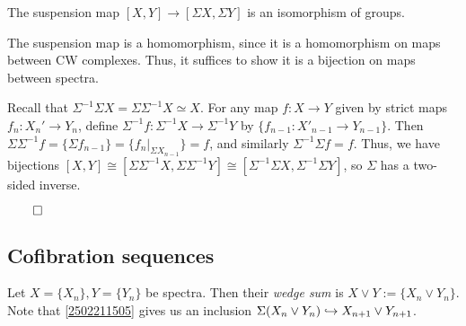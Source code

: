 \documentclass{MetricNotes2023}
\def\inj{\ensuremath\hookrightarrow}
\def\done{\begin{flushright}\vspace{-4.35ex}\(\qed\)\end{flushright}}
\begin{document}
\begin{theorem}\label{2504151310}
The suspension map \([X,Y]\to [\Sigma X, \Sigma Y]\) is an isomorphism of groups.
\end{theorem}

\begin{ourproof}
The suspension map is a homomorphism, since it is a homomorphism on maps between CW complexes. Thus, it suffices to show it is a bijection on maps between spectra. 

Recall that \(\Sigma^{-1}\Sigma X=\Sigma\Sigma^{-1}X\simeq X\). For any map \(f : X \to Y\) given by strict maps \(f_n : X_n'\to Y_n\), define \(\Sigma^{-1}f : \Sigma^{-1}X \to \Sigma^{-1}Y\) by \(\{f_{n-1} : X'_{n-1}\to Y_{n-1}\}\). Then \(\Sigma\Sigma^{-1}f=\{\Sigma f_{n-1}\}=\{f_n|_{\Sigma X_{n-1}}\}=f\), and similarly \(\Sigma^{-1}\Sigma f =f\). Thus, we have bijections \([X,Y]\cong [\Sigma\Sigma^{-1}X, \Sigma\Sigma^{-1}Y]\cong [\Sigma^{-1}\Sigma X, \Sigma^{-1}\Sigma Y]\), so \(\Sigma\) has a two-sided inverse. \done
\end{ourproof}




\subsection{Cofibration sequences}\label{2503291211}

\begin{definition}
Let \(X=\{X_n\}, Y=\{Y_n\}\) be spectra. Then their \textit{wedge sum} %
 is \(X\vee Y :=\{X_n \vee Y_n\}\). Note that \ref{2502211505} gives us an inclusion \(\Sigma(X_n\vee Y_n)\inj X_{n+1}\vee Y_{n+1}\). 
\end{definition}
\end{document}
